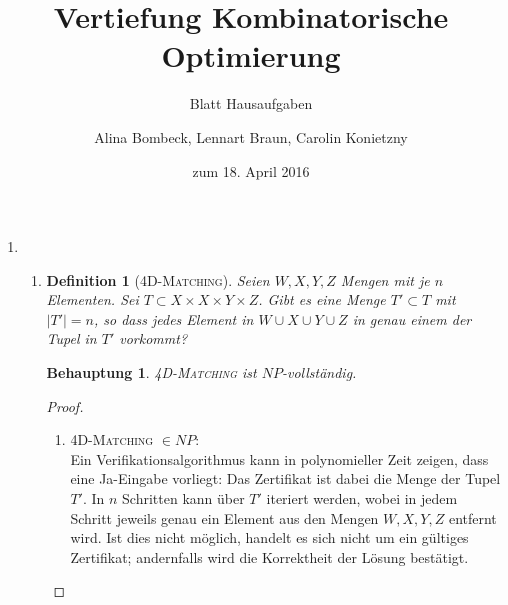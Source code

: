 \documentclass[a4paper]{scrartcl}
\title{Vertiefung Kombinatorische Optimierung}
\subtitle{Blatt {\blattnr} Hausaufgaben}
\author{%
    Alina Bombeck,
    Lennart Braun,
    Carolin Konietzny
}
\date{zum 18. April 2016}
\newtheorem*{proposition}{Behauptung}
\newtheorem*{definition}{Definition}
\begin{document}
\maketitle


\begin{enumerate}[label=\bfseries \arabic*]
\item %
\begin{enumerate}
\item
    \begin{definition}[\textsc{4D-Matching}]
        Seien $W,X,Y,Z$ Mengen mit je $n$ Elementen.
        Sei $T \subset X \times X \times Y \times Z$.
        Gibt es eine Menge $T' \subset T$ mit $|T'| = n$, so dass jedes Element
        in $W \cup X \cup Y \cup Z$ in genau einem der Tupel in $T'$ vorkommt?
    \end{definition}
    \begin{proposition}
        \textsc{4D-Matching} ist $NP$-vollständig.
    \end{proposition}
    \begin{proof}
        \hfill \\
        \begin{enumerate}
            \item \textsc{4D-Matching} $\in NP$: \\
                Ein Verifikationsalgorithmus kann in polynomieller Zeit zeigen,
                dass eine Ja-Eingabe vorliegt: Das Zertifikat ist dabei die
                Menge der Tupel $T'$. In $n$ Schritten kann über $T'$ iteriert
                werden, wobei in jedem Schritt jeweils genau ein Element aus
                den Mengen $W,X,Y,Z$ entfernt wird. Ist dies nicht möglich,
                handelt es sich nicht um ein gültiges Zertifikat; andernfalls
                wird die Korrektheit der Lösung bestätigt.


\end{enumerate}
\end{proof}
\end{enumerate}
\end{enumerate}
\end{document}
